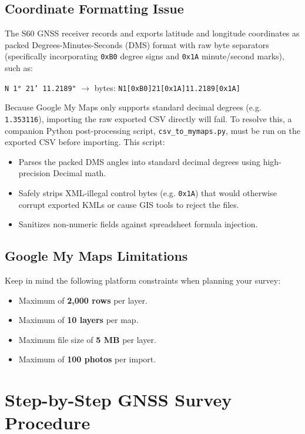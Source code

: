 \documentclass[11pt, letterpaper]{article}
\begin{document}
\subsection{Coordinate Formatting Issue}
The S60 GNSS receiver records and exports latitude and longitude coordinates as packed Degrees-Minutes-Seconds (DMS) format with raw byte separators (specifically incorporating \texttt{0xB0} degree signs and \texttt{0x1A} minute/second marks), such as:
\begin{center}
    \texttt{N 1° 21' 11.2189"} \quad $\rightarrow$ \quad bytes: \quad \texttt{N1[0xB0]21[0x1A]11.2189[0x1A]}
\end{center}
Because Google My Maps only supports standard decimal degrees (e.g. \texttt{1.353116}), importing the raw exported CSV directly will fail. To resolve this, a companion Python post-processing script, \texttt{csv\_to\_mymaps.py}, must be run on the exported CSV before importing. This script:
\begin{itemize}
    \item Parses the packed DMS angles into standard decimal degrees using high-precision Decimal math.
    \item Safely strips XML-illegal control bytes (e.g. \texttt{0x1A}) that would otherwise corrupt exported KMLs or cause GIS tools to reject the files.
    \item Sanitizes non-numeric fields against spreadsheet formula injection.
\end{itemize}

\subsection{Google My Maps Limitations}
Keep in mind the following platform constraints when planning your survey:
\begin{itemize}
    \item Maximum of \textbf{2,000 rows} per layer.
    \item Maximum of \textbf{10 layers} per map.
    \item Maximum file size of \textbf{5 MB} per layer.
    \item Maximum of \textbf{100 photos} per import.
\end{itemize}

\clearpage

\section{Step-by-Step GNSS Survey Procedure}
\end{document}
